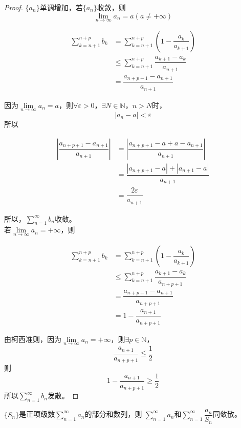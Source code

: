 \begin{proof}

    $\{a_n\}$单调增加，若$\{a_n\}$收敛，则
    $$\lim_{n\to\infty}{a_n}=a(a\neq+\infty)$$

    \begin{align*}
        \sum_{k=n+1}^{n+p}{b_k} &= \sum_{k=n+1}^{n+p}{(1-\dfrac{a_k}{a_{k+1}})}\\
        & \leq \sum_{k=n+1}^{n+p}{\dfrac{a_{k+1}-a_k}{a_{n+1}}}\\
        & = \dfrac{a_{n+p+1}-a_{n+1}}{a_{n+1}}
    \end{align*}

    因为$\lim\limits_{n\to\infty}{a_n}=a$，则$\forall \varepsilon >0$，$\exists N\in \mathbb{N}$，$n>N$时，
    $$|a_n-a|<\varepsilon$$
    所以

    \begin{align*}
        \left| \dfrac{a_{n+p+1}-a_{n+1}}{a_{n+1}}\right| &= \left| \dfrac{a_{n+p+1}-a + a -a_{n+1}}{a_{n+1}}\right|\\
        & = \dfrac{|a_{n+p+1}-a|+|a_{n+1}-a|}{a_{n+1}}\\
        & = \dfrac{2\varepsilon}{a_{n+1}}
    \end{align*} 

    所以，$\sum\limits_{n=1}^{\infty}{b_n}$收敛。\\
    若$\lim\limits_{n\to\infty}{a_n}=+\infty$，则

    \begin{align*}
        \sum_{k=n+1}^{n+p}{b_k} &= \sum_{k=n+1}^{n+p}{(1-\dfrac{a_k}{a_{k+1}})}\\
        & \leq \sum_{k=n+1}^{n+p}{\dfrac{a_{k+1}-a_k}{a_{n+p+1}}}\\
        & = \dfrac{a_{n+p+1}-a_{n+1}}{a_{n+p+1}}\\
        & = 1-\dfrac{a_{n+1}}{a_{n+p+1}}
    \end{align*}

    由柯西准则，因为$\lim\limits_{n\to\infty}{a_n}=+\infty$，则$\exists p \in \mathbb{N}$，
    $$ \dfrac{a_{n+1}}{a_{n+p+1}} \leq \dfrac{1}{2}$$
    则
    $$ 1-\dfrac{a_{n+1}}{a_{n+p+1}} \geq \dfrac{1}{2}$$
    所以$\sum\limits_{n=1}^{\infty}{b_n}$发散。

\end{proof}

\begin{theorem}
    
    $\{S_n\}$是正项级数$\sum\limits_{n=1}^{\infty}{a_n}$的部分和数列，则
    $\sum\limits_{n=1}^{\infty}{a_n}$和$\sum\limits_{n=1}^{\infty}{\dfrac{a_n}{S_n}}$同敛散。

\end{theorem}

